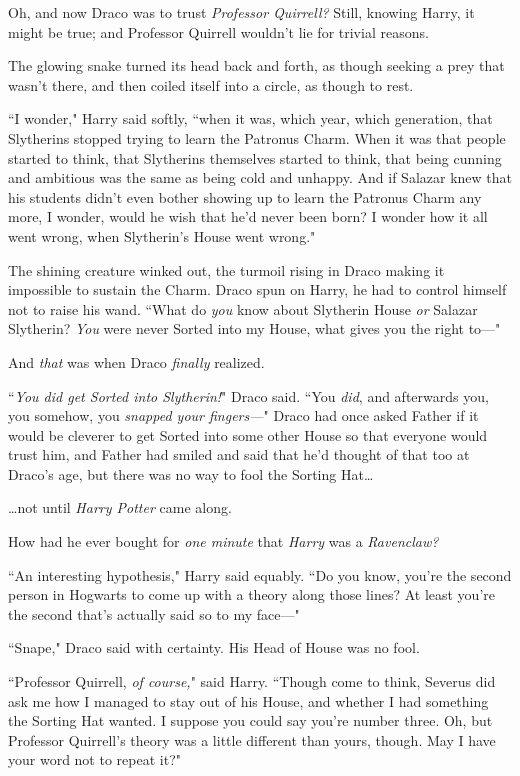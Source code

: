 Oh, and now Draco was to trust \emph{Professor Quirrell?} Still, knowing Harry, it might be true; and Professor Quirrell wouldn't lie for trivial reasons.

The glowing snake turned its head back and forth, as though seeking a prey that wasn't there, and then coiled itself into a circle, as though to rest.

``I wonder," Harry said softly, ``when it was, which year, which generation, that Slytherins stopped trying to learn the Patronus Charm. When it was that people started to think, that Slytherins themselves started to think, that being cunning and ambitious was the same as being cold and unhappy. And if Salazar knew that his students didn't even bother showing up to learn the Patronus Charm any more, I wonder, would he wish that he'd never been born? I wonder how it all went wrong, when Slytherin's House went wrong."

The shining creature winked out, the turmoil rising in Draco making it impossible to sustain the Charm. Draco spun on Harry, he had to control himself not to raise his wand. ``What do \emph{you} know about Slytherin House \emph{or} Salazar Slytherin? \emph{You} were never Sorted into my House, what gives you the right to—"

And \emph{that} was when Draco \emph{finally} realized.

``\emph{You did get Sorted into Slytherin!}" Draco said. ``You \emph{did}, and afterwards you, you somehow, you \emph{snapped your fingers—}" Draco had once asked Father if it would be cleverer to get Sorted into some other House so that everyone would trust him, and Father had smiled and said that he'd thought of that too at Draco's age, but there was no way to fool the Sorting Hat{\ldots}

{\ldots}not until \emph{Harry Potter} came along.

How had he ever bought for \emph{one minute} that \emph{Harry} was a \emph{Ravenclaw?}

``An interesting hypothesis," Harry said equably. ``Do you know, you're the second person in Hogwarts to come up with a theory along those lines? At least you're the second that's actually said so to my face—"

``Snape," Draco said with certainty. His Head of House was no fool.

``Professor Quirrell, \emph{of course,}" said Harry. ``Though come to think, Severus did ask me how I managed to stay out of his House, and whether I had something the Sorting Hat wanted. I suppose you could say you're number three. Oh, but Professor Quirrell's theory was a little different than yours, though. May I have your word not to repeat it?"


